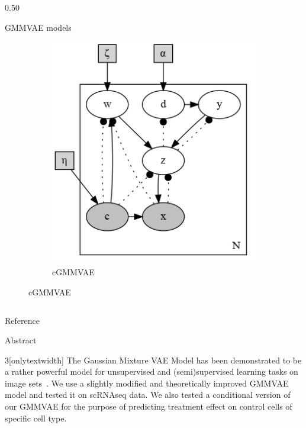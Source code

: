 \documentclass[final]{beamer}
\begin{document}
\begin{frame}[t]
\begin{columns}
\begin{column}{0.50\textwidth}
\begin{block}{GMMVAE models}
\begin{figure}[h]
\begin{subfigure}[b]{0.35\linewidth}
\end{subfigure}
\begin{subfigure}[b]{0.39\linewidth}
\includegraphics[width=0.97\linewidth]{./plots/dirichlet_gmm_cvae.gv.png}
\caption{cGMMVAE}
\end{subfigure}
\end{figure}
\end{block}
\end{column}

\end{columns}


\begin{block}{Reference}
\printbibliography
\end{block}

\begin{block}{Abstract}
\begin{multicols}{3}[onlytextwidth]
The Gaussian Mixture VAE Model has been demonstrated to be a rather powerful 
model for unsupervised and (semi)supervised learning tasks on image
sets~\cite{dilokthanakul2016deep}.
We use a slightly modified and theoretically improved GMMVAE model and tested it on scRNAseq data.
We also tested a conditional version of our GMMVAE for the purpose of predicting
treatment effect on control cells of specific cell type.


\end{multicols}
\end{block}
\end{frame}
\end{document}
